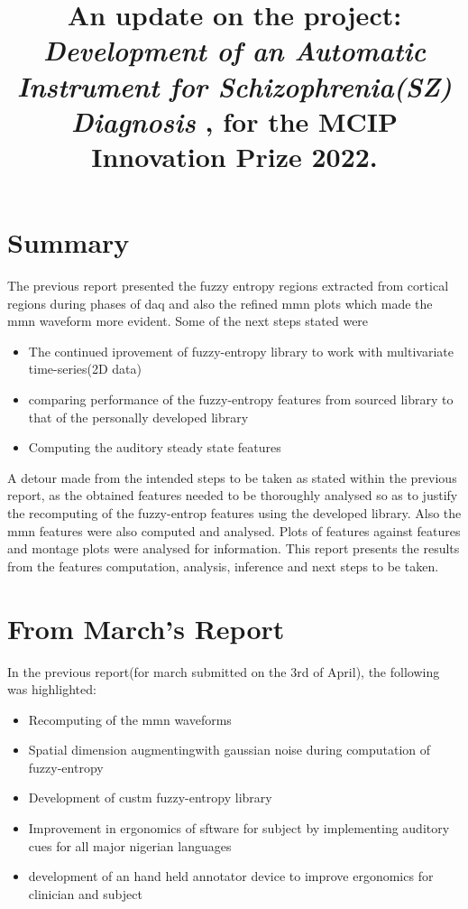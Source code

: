 \documentclass[10pt]{article}
\title{
  An update on the project: 
  \textbf{
      \textit{
        Development of an Automatic Instrument for Schizophrenia(SZ) Diagnosis
        }
      }, for the MCIP Innovation Prize 2022.
  }
\begin{document}
\maketitle

\section{Summary}
The previous report presented the fuzzy entropy regions extracted from cortical
regions during phases of \gls{daq} and also the refined \gls{mmn} plots which 
made the \gls{mmn} waveform more evident. Some of the next steps stated were
\begin{itemize}
  \item The continued iprovement of fuzzy-entropy library to work with multivariate \\
  time-series(2D data)
  \item comparing performance of the fuzzy-entropy features from sourced library to \\
  that of the personally developed library
  \item Computing the auditory steady state features
\end{itemize}
A detour made from the intended steps to be taken as stated within the previous report, 
as the obtained features needed to be thoroughly analysed so as to justify the recomputing 
of the fuzzy-entrop features using the developed library. Also the \gls{mmn} features 
were also computed and analysed. Plots of features against features and montage plots 
were analysed for information. This report presents the results from the features 
computation, analysis, inference and next steps to be taken.

\section{From March's Report}
In the previous report(for march submitted on the 3rd of April), the following was highlighted:
\begin{itemize}
  \item Recomputing of the \gls{mmn} waveforms
  \item Spatial dimension augmentingwith gaussian noise during computation of fuzzy-entropy
  \item Development of custm fuzzy-entropy library
  \item Improvement in ergonomics of sftware for subject by implementing auditory cues for all 
  major nigerian languages
  \item development of an hand held annotator device to improve ergonomics for clinician and subject
\end{itemize} 
\end{document}
